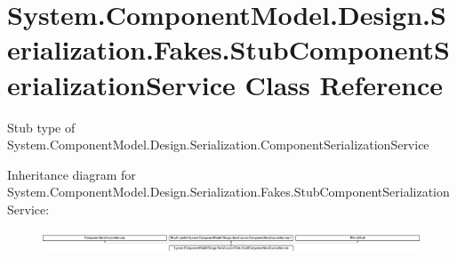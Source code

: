 \hypertarget{class_system_1_1_component_model_1_1_design_1_1_serialization_1_1_fakes_1_1_stub_component_serialization_service}{\section{System.\-Component\-Model.\-Design.\-Serialization.\-Fakes.\-Stub\-Component\-Serialization\-Service Class Reference}
\label{class_system_1_1_component_model_1_1_design_1_1_serialization_1_1_fakes_1_1_stub_component_serialization_service}
}


Stub type of System.\-Component\-Model.\-Design.\-Serialization.\-Component\-Serialization\-Service 


Inheritance diagram for System.\-Component\-Model.\-Design.\-Serialization.\-Fakes.\-Stub\-Component\-Serialization\-Service\-:\begin{figure}[H]
\begin{center}
\leavevmode
\includegraphics[height=0.681265cm]{class_system_1_1_component_model_1_1_design_1_1_serialization_1_1_fakes_1_1_stub_component_serialization_service}
\end{center}
\end{figure}
